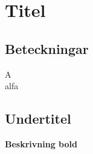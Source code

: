 \section{Titel}
\subsection*{Beteckningar}
\acrfull{A}\\
\acrfull{alfa}

\subsection{Undertitel}
\textbf{Beskrivning bold}
